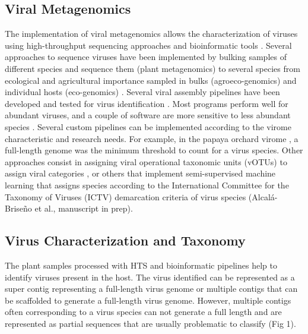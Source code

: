 \documentclass[11pt]{article}
\begin{document}
\subsection{Viral Metagenomics}
The implementation of viral metagenomics allows the characterization of viruses using high-throughput sequencing approaches and bioinformatic tools \cite{roossinck_metagenomics_2015, roossinck_plant_2015}. Several approaches to sequence viruses have been implemented by bulking samples of different species and sequence them (plant metagenomics) to several species from ecological and agricultural importance sampled in bulks (agroeco-genomics) and individual hosts (eco-genomics) \cite{roossinck_plant_2015}.  
Several viral assembly pipelines have been developed and tested for virus identification \cite{doi:10.1094/PHYTO-02-18-0067-R}. Most programs perform well for abundant viruses, and a couple of software are more sensitive to less abundant species . Several custom pipelines can be implemented according to the virome characteristic and research needs. For example, in the papaya orchard virome \cite{alcala2020network}, a full-length genome was the minimum threshold to count for a virus species. Other approaches consist in assigning viral operational taxonomic units (vOTUs) to assign viral categories \cite{doi:10.1094/PBIOMES-07-19-0037-A}, or others that implement semi-supervised machine learning that assigns species according to the International Committee for the Taxonomy of Viruses (ICTV) demarcation criteria of virus species  (Alcal\'a-Brise\~no et al., manuscript in prep). 

\subsection{Virus Characterization and Taxonomy}
The plant samples processed with HTS and bioinformatic pipelines help to identify viruses present in the host. The virus identified can be represented as a super contig representing a full-length virus genome or multiple contigs that can be scaffolded to generate a full-length virus genome. However, multiple contigs often corresponding to a virus species can not generate a full length and are represented as partial sequences that are usually problematic to classify (Fig 1).
\end{document}
